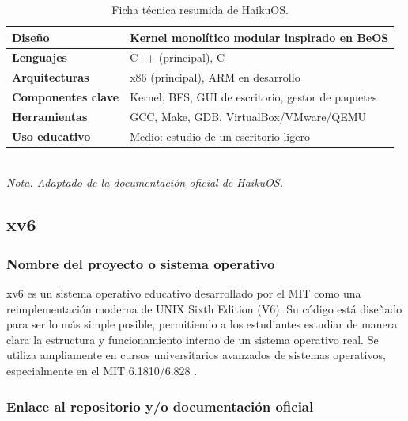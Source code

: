 \begin{table}[H]
    \centering
    \caption{Ficha técnica resumida de HaikuOS.}
    \vspace{2mm}
    \begin{tabular}{p{4cm}p{10cm}}
        \hline
        \textbf{Diseño}            & Kernel monolítico modular inspirado en BeOS        \\ \hline
        \textbf{Lenguajes}         & C++ (principal), C                                  \\
        \textbf{Arquitecturas}     & x86 (principal), ARM en desarrollo                  \\
        \textbf{Componentes clave} & Kernel, BFS, GUI de escritorio, gestor de paquetes  \\
        \textbf{Herramientas}      & GCC, Make, GDB, VirtualBox/VMware/QEMU             \\
        \textbf{Uso educativo}     & Medio: estudio de un escritorio ligero              \\
        \hline
    \end{tabular}
    \vspace{1mm} \\
    \textit{Nota. Adaptado de la documentación oficial de HaikuOS.}
\end{table}


\subsection{xv6}

\subsubsection{Nombre del proyecto o sistema operativo}

xv6 es un sistema operativo educativo desarrollado por el MIT como una reimplementación moderna de UNIX Sixth Edition (V6). Su código está diseñado para ser lo más simple posible, permitiendo a los estudiantes estudiar de manera clara la estructura y funcionamiento interno de un sistema operativo real. Se utiliza ampliamente en cursos universitarios avanzados de sistemas operativos, especialmente en el MIT 6.1810/6.828 \cite{xv6_mit_about, xv6_wiki}.

\subsubsection{Enlace al repositorio y/o documentación oficial}

